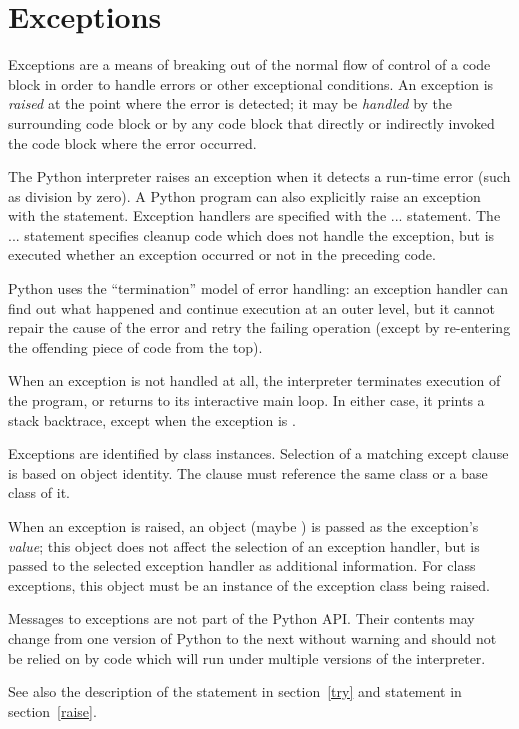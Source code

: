 \section{Exceptions \label{exceptions}}

Exceptions are a means of breaking out of the normal flow of control
of a code block in order to handle errors or other exceptional
conditions.  An exception is
\emph{raised} at the point where the error
is detected; it may be \emph{handled} by
the surrounding code block or by any code block that directly or
indirectly invoked the code block where the error occurred.

The Python interpreter raises an exception when it detects a run-time
error (such as division by zero).  A Python program can also
explicitly raise an exception with the  statement.
Exception handlers are specified with the  ... 
statement.  The  ...  statement
specifies cleanup code which does not handle the exception, but is
executed whether an exception occurred or not in the preceding code.

Python uses the ``termination'' model of
error handling: an exception handler can find out what happened and
continue execution at an outer level, but it cannot repair the cause
of the error and retry the failing operation (except by re-entering
the offending piece of code from the top).

When an exception is not handled at all, the interpreter terminates
execution of the program, or returns to its interactive main loop.  In
either case, it prints a stack backtrace, except when the exception is 
.

Exceptions are identified by class instances.
Selection of a matching except clause is based on object identity.
The  clause must reference the same class or a base
class of it.

When an exception is raised, an object (maybe ) is passed
as the exception's \emph{value}; this object does not affect the
selection of an exception handler, but is passed to the selected
exception handler as additional information.  For class exceptions,
this object must be an instance of the exception class being raised.

\begin{notice}[warning]
Messages to exceptions are not part of the Python API.  Their contents may
change from one version of Python to the next without warning and should not
be relied on by code which will run under multiple versions of the
interpreter.
\end{notice}

See also the description of the  statement in
section~\ref{try} and  statement in
section~\ref{raise}.
